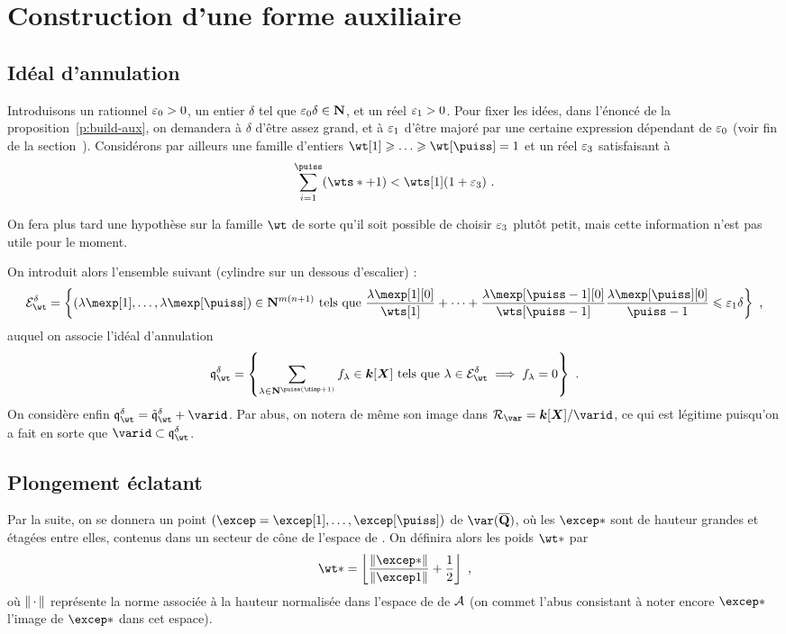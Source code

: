 
\section{Construction d'une forme auxiliaire}

\subsection{Idéal d'annulation}

Introduisons un rationnel ${\varepsilon_0} > 0$, un entier $\delta$ tel que
${\varepsilon_0}\delta \in {\mathbf{N}}$, et un réel ${\varepsilon_1} > 0$. Pour fixer les idées, dans
l'énoncé de la proposition~\ref{p:build-aux}, on demandera à $\delta$ d'être
assez grand, et à ${\varepsilon_1}$ d'être majoré par une certaine expression dépendant
de ${\varepsilon_0}$ (voir fin de la section~). Considérons par
ailleurs une famille d'entiers $\wt[1] \ge \dots \ge \wt[\puiss] = 1$ et un
réel ${\varepsilon_3}$ satisfaisant à
\[
  \sum_{\fct=1}^\puiss (\wts* + 1) < \wts[1] (1 + \epsiii)
  \pmm.
\]

On fera plus tard une hypothèse sur la famille $\wt$ de sorte qu'il soit
possible de choisir ${\varepsilon_3}$ plutôt petit, mais cette information n'est pas
utile pour le moment.

On introduit alors l'ensemble suivant (cylindre sur un dessous d'escalier) :
\[
  \stairs = \left\{
    (\coeff[1], \dots, \coeff[\puiss]) \in \N^{m(n+1)}
    \text{ tels que }
    \frac {\coeff[1][0]} {\wts[1]}
    + \dots +
    \frac {\coeff[\puiss-1][0]} {\wts[\puiss-1]}
    \frac {\coeff[\puiss][0]} {\puiss-1}
    \le \epsi \delta
    \right\}
  \pmm,
\]
auquel on associe l'idéal d'annulation
\[
  \vanish = \left\{
    \sum_{\lambda \in \N^{\puiss(\dimp+1)}} f_\lambda
    \in \cdn [\cmmh]
    \text{ tels que }
    \lambda \in \stairs
    \implies
    f_\lambda = 0
    \right\}
  \pmm.
\]
On considère enfin $\vanish = \vanish* + \varid$. Par abus,
on notera de même son image dans $\ring\var = \cdn [\cmmh] / \varid$, ce qui
est légitime puisqu'on a fait en sorte que $\varid \subset \vanish$.

\subsection{Plongement éclatant}

Par la suite, on se donnera un point
$(\excep = \excep[1], \dots, \excep[\puiss])$
de $\var(\Qbar)$, où les $\excep*$ sont de hauteur grandes et étagées entre
elles, contenus dans un secteur de cône de l'espace de . On
définira alors les poids $\wt*$ par
\begin{equation}
  \wt* =
  \left\lfloor
  \frac {\norm{\excep*}} {\norm{\excep1}}
  + \frac12
  \right\rfloor
  \pmm,
\end{equation}
où $\lVert{\,\cdot\,}\rVert$ représente la norme associée à la hauteur normalisée dans
l'espace de  de $\mathcal A$ (on commet l'abus consistant à noter
encore $\excep*$ l'image de $\excep*$ dans cet espace).

